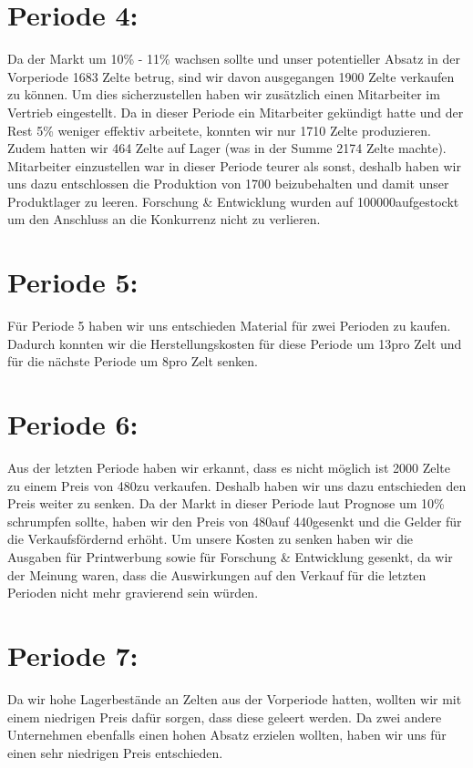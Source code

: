 \documentclass[a4paper, 12pt]{report}
\begin{document}
\begin{flushleft}
\section{Periode 4:}
Da der Markt um 10\% - 11\% wachsen sollte und unser potentieller Absatz in der Vorperiode 1683 Zelte betrug, sind wir davon ausgegangen 1900 Zelte verkaufen zu können.
Um dies sicherzustellen haben wir zusätzlich einen Mitarbeiter im Vertrieb eingestellt.
Da in dieser Periode ein Mitarbeiter gekündigt hatte und der Rest 5\% weniger effektiv arbeitete, konnten wir nur 1710 Zelte produzieren.
Zudem hatten wir 464 Zelte auf Lager (was in der Summe 2174 Zelte machte).
Mitarbeiter einzustellen war in dieser Periode teurer als sonst,
deshalb haben wir uns dazu entschlossen die Produktion von 1700 beizubehalten und damit unser Produktlager zu leeren.
Forschung \& Entwicklung wurden auf 100000\texteuro aufgestockt um den Anschluss an die Konkurrenz nicht zu verlieren.  

\section{Periode 5:}
Für Periode 5 haben wir uns entschieden Material für zwei Perioden zu kaufen.
Dadurch konnten wir die Herstellungskosten für diese Periode um 13\texteuro pro Zelt und für die nächste Periode um 8\texteuro pro Zelt senken.

\newpage
\section{Periode 6:}
Aus der letzten Periode haben wir erkannt, dass es nicht möglich ist 2000 Zelte zu einem Preis von 480\texteuro zu verkaufen.
Deshalb haben wir uns dazu entschieden den Preis weiter zu senken.
Da der Markt in dieser Periode laut Prognose um 10\% schrumpfen sollte, haben wir den Preis von 480\texteuro auf 440\texteuro gesenkt und die Gelder für die Verkaufsfördernd erhöht.
Um unsere Kosten zu senken haben wir die Ausgaben für Printwerbung sowie für Forschung \& Entwicklung gesenkt, da wir der Meinung waren, dass die Auswirkungen auf den Verkauf für die letzten Perioden nicht mehr gravierend sein würden.


\section{Periode 7:}
Da wir hohe Lagerbestände an Zelten aus der Vorperiode hatten, wollten wir mit einem niedrigen Preis dafür sorgen,
dass diese geleert werden.
Da zwei andere Unternehmen ebenfalls einen hohen Absatz erzielen wollten, haben wir uns für einen sehr niedrigen Preis entschieden.



\end{flushleft}
\end{document}
